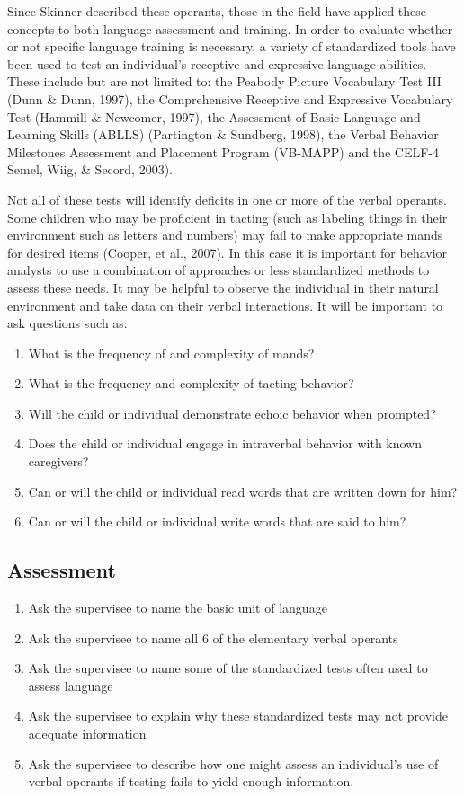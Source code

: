 Since Skinner described these operants, those in the field have applied these concepts to both language assessment and training.  In order to evaluate whether or not specific language training is necessary, a variety of standardized tools have been used to test an individual's receptive and expressive language abilities.  These include but are not limited to: the Peabody Picture Vocabulary Test III (Dunn \& Dunn, 1997), the Comprehensive Receptive and Expressive Vocabulary Test (Hammill \& Newcomer, 1997), the Assessment of Basic Language and Learning Skills (ABLLS) (Partington \& Sundberg, 1998), the Verbal Behavior Milestones Assessment and Placement Program (VB-MAPP) and the CELF-4 Semel, Wiig, \& Secord, 2003).  

Not all of these tests will identify deficits in one or more of the verbal operants. Some children who may be proficient in tacting (such as labeling things in their environment such as letters and numbers) may fail to make appropriate mands for desired items (Cooper, et al., 2007).  In this case it is important for behavior analysts to use a combination of approaches or less standardized methods to assess these needs.  It may be helpful to observe the individual in their natural environment and take data on their verbal interactions.  It will be important to ask questions such as:
\begin{enumerate}
\item What is the frequency of and complexity of mands?
\item What is the frequency and complexity of tacting behavior?
\item Will the child or individual demonstrate echoic behavior when prompted?
\item Does the child or individual engage in intraverbal behavior with known caregivers?
\item Can or will the child or individual read words that are written down for him?
\item Can or will the child or individual write words that are said to him? 
\end{enumerate}
%
\subsection{Assessment}
\begin{enumerate}
\item Ask the supervisee to name the basic unit of language
\item Ask the supervisee to name all 6 of the elementary verbal operants
\item Ask the supervisee to name some of the standardized tests often used to assess language
\item Ask the supervisee to explain why these standardized tests may not provide adequate information
\item Ask the supervisee to describe how one might assess an individual's use of verbal operants if testing fails to yield enough information.
\end{enumerate}
%
